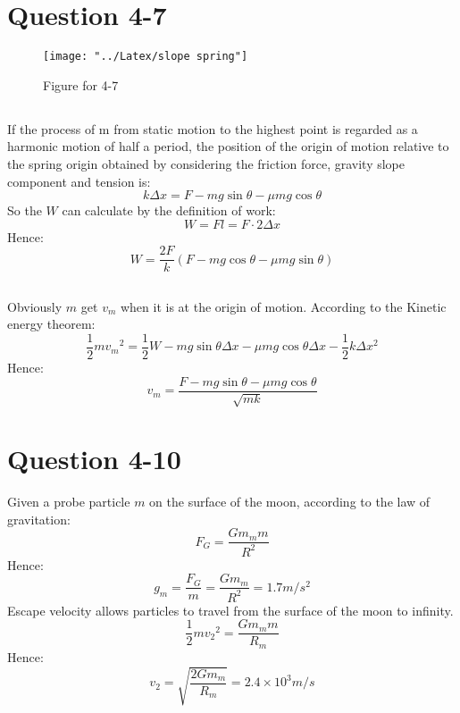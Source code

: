 \documentclass[12pt,a4paper]{article}%
\begin{document}
	\section{Question 4-7}
	\begin{figure}[H]
		\centering
		\texttt{[image: "../Latex/slope spring"]}
		\caption*{Figure for 4-7}
		\label{fig:slope-spring}
	\end{figure}
	\subsection{}
	\noindent If the process of m from static motion to the highest point is regarded as a harmonic motion of half a period, the position of the origin of motion relative to the spring origin obtained by considering the friction force, gravity slope component and tension is:
	\begin{equation}
		k\Delta x=F-mg\sin \theta -\mu mg\cos \theta
	\end{equation}
	So the $W$ can calculate by the definition of work:
	\begin{equation}
		W=Fl=F\cdot2\Delta x
	\end{equation}
	Hence:
	\begin{equation*}
		W=\frac{2F}{k}\left( F-mg\cos \theta -\mu mg\sin \theta \right) 
	\end{equation*}
	\subsection{}	
	Obviously $m$ get $v_m$ when it is at the origin of motion. According to the Kinetic energy theorem:
	\begin{equation}
		\frac{1}{2}{mv_m}^2=\frac{1}{2}W-mg\sin \theta \Delta x-\mu mg\cos \theta \Delta x-\frac{1}{2}k\Delta x^2
	\end{equation}
	Hence:
	\begin{equation*}
		v_m=\frac{F-mg\sin \theta -\mu mg\cos \theta}{\sqrt{mk}}
	\end{equation*}
	\newpage
	\section{Question 4-10}
	\noindent Given a probe particle $m$ on the surface of the moon, according to the law of gravitation:
	\begin{equation}
		F_G=\frac{Gm_mm}{R^2}
	\end{equation}
	Hence:
	\begin{equation*}
    	g_m=\frac{F_G}{m}=\frac{Gm_m}{R^2}=1.7m/s^2
	\end{equation*}
	Escape velocity allows particles to travel from the surface of the moon to infinity.
	\begin{equation}
		\frac{1}{2}{mv_2}^2=\frac{Gm_mm}{R_m}
	\end{equation}
	Hence:
	\begin{equation*}
		v_2=\sqrt{\frac{2Gm_m}{R_m}}=2.4\times 10^3m/s
	\end{equation*}
\end{document}
